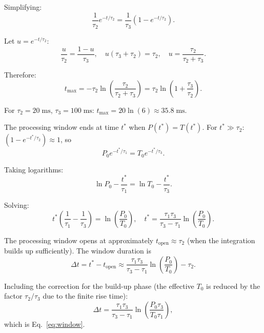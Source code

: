\documentclass[twocolumn,10pt]{article}
\theoremstyle{remark}
\begin{document}
Simplifying:
\begin{equation}
\frac{1}{\tau_2}e^{-t/\tau_2} = \frac{1}{\tau_3}(1 - e^{-t/\tau_2}).
\end{equation}

Let $u = e^{-t/\tau_2}$:
\begin{equation}
\frac{u}{\tau_2} = \frac{1 - u}{\tau_3}, \quad u(\tau_3 + \tau_2) = \tau_2, \quad u = \frac{\tau_2}{\tau_2 + \tau_3}.
\end{equation}

Therefore:
\begin{equation}
t_{\max} = -\tau_2 \ln\!\left(\frac{\tau_2}{\tau_2 + \tau_3}\right) = \tau_2 \ln\!\left(1 + \frac{\tau_3}{\tau_2}\right).
\end{equation}

For $\tau_2 = 20\;\mathrm{ms}$, $\tau_3 = 100\;\mathrm{ms}$: $t_{\max} = 20 \ln(6) \approx 35.8\;\mathrm{ms}$.

The processing window ends at time $t^*$ when $P(t^*) = T(t^*)$. For $t^* \gg \tau_2$: $(1 - e^{-t^*/\tau_2}) \approx 1$, so
\begin{equation}
P_0 e^{-t^*/\tau_1} = T_0 e^{-t^*/\tau_3}.
\end{equation}

Taking logarithms:
\begin{equation}
\ln P_0 - \frac{t^*}{\tau_1} = \ln T_0 - \frac{t^*}{\tau_3}.
\end{equation}

Solving:
\begin{equation}
t^* \!\left(\frac{1}{\tau_1} - \frac{1}{\tau_3}\right) = \ln\!\left(\frac{P_0}{T_0}\right), \quad t^* = \frac{\tau_1\tau_3}{\tau_3 - \tau_1}\ln\!\left(\frac{P_0}{T_0}\right).
\end{equation}

The processing window opens at approximately $t_{\mathrm{open}} \approx \tau_2$ (when the integration builds up sufficiently). The window duration is
\begin{equation}
\Delta t = t^* - t_{\mathrm{open}} \approx \frac{\tau_1\tau_3}{\tau_3 - \tau_1}\ln\!\left(\frac{P_0}{T_0}\right) - \tau_2.
\end{equation}

Including the correction for the build-up phase (the effective $T_0$ is reduced by the factor $\tau_2/\tau_3$ due to the finite rise time):
\begin{equation}
\Delta t = \frac{\tau_1\tau_3}{\tau_3 - \tau_1}\ln\!\left(\frac{P_0 \tau_3}{T_0 \tau_1}\right),
\end{equation}
which is Eq.~\eqref{eq:window}.
\end{document}

